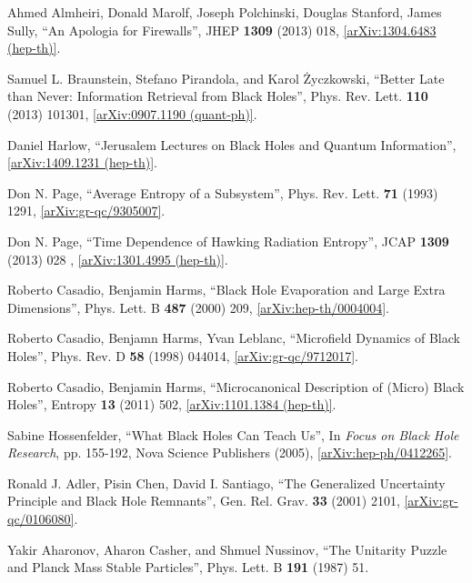 \documentclass[12pt]{article}
\newcommand{\2}{$^2$}
\newcommand{\3}{$^3$}
\newcommand{\4}{$_4$}
\newcommand{\5}{$_5$}
\begin{document}
\begin{thebibliography}{400}
Ahmed Almheiri, Donald Marolf, Joseph Polchinski, Douglas Stanford, James Sully,
``An Apologia for Firewalls'', JHEP \textbf{1309} (2013) 018, \href{http://arxiv.org/abs/1304.6483}{[arXiv:1304.6483 (hep-th)]}.

Samuel L. Braunstein, Stefano Pirandola, and Karol \.Zyczkowski, ``Better Late than Never: Information Retrieval from Black Holes'', Phys. Rev. Lett. \textbf{110} (2013) 101301, \href{http://arxiv.org/abs/0907.1190}{[arXiv:0907.1190 (quant-ph)]}.

Daniel Harlow, ``Jerusalem Lectures on Black Holes and Quantum Information'',
\href{http://arxiv.org/abs/1409.1231}{[arXiv:1409.1231 (hep-th)]}.

Don N. Page, ``Average Entropy of a Subsystem'', Phys. Rev. Lett. \textbf{71} (1993) 1291, \href{http://arxiv.org/abs/gr-qc/9305007}{[arXiv:gr-qc/9305007]}.

Don N. Page, ``Time Dependence of Hawking Radiation Entropy'', JCAP \textbf{1309} (2013) 028 , \href{http://arxiv.org/abs/1301.4995}{[arXiv:1301.4995 (hep-th)]}.

Roberto Casadio, Benjamin Harms, ``Black Hole Evaporation and Large Extra Dimensions'', Phys. Lett. B \textbf{487} (2000) 209, \href{http://arxiv.org/abs/hep-th/0004004}{[arXiv:hep-th/0004004]}.

Roberto Casadio, Benjamn Harms, Yvan Leblanc, ``Microfield Dynamics of Black Holes'', Phys. Rev. D \textbf{58} (1998) 044014, \href{http://arxiv.org/abs/gr-qc/9712017}{[arXiv:gr-qc/9712017]}.

Roberto Casadio, Benjamin Harms, ``Microcanonical Description of (Micro) Black Holes'', Entropy \textbf{13} (2011) 502, \href{http://arxiv.org/abs/1101.1384}{[arXiv:1101.1384 (hep-th)]}.

Sabine Hossenfelder, ``What Black Holes Can Teach Us'', In \emph{Focus on Black Hole Research}, pp. 155-192, Nova Science Publishers (2005), \href{http://arxiv.org/abs/hep-ph/0412265}{[arXiv:hep-ph/0412265]}.

Ronald J. Adler, Pisin Chen, David I. Santiago, ``The Generalized Uncertainty Principle and Black Hole Remnants'', 	Gen. Rel. Grav. \textbf{33} (2001) 2101, \href{http://arxiv.org/abs/gr-qc/0106080}{[arXiv:gr-qc/0106080]}.


Yakir Aharonov, Aharon Casher, and Shmuel Nussinov, ``The Unitarity Puzzle and Planck Mass Stable Particles'', Phys. Lett. B \textbf{191} (1987) 51.



\end{thebibliography}
\end{document}
